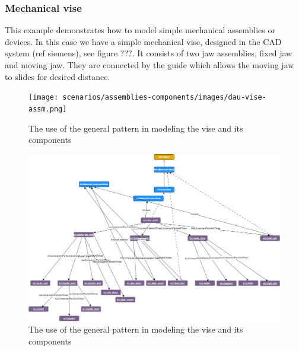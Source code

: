 \subsubsection*{Mechanical vise}
This example demonstrates how to model simple mechanical assemblies or devices. In this case we have a simple mechanical vise, designed in the CAD system (ref siemens), see figure ???. It consists of two jaw assemblies, fixed jaw and moving jaw. They are connected by the guide which allows the moving jaw to slides for desired distance.
\begin{figure}
\texttt{[image: scenarios/assemblies-components/images/dau-vise-assm.png]}
\caption{The use of the general pattern in modeling the vise and its components} 
\label{vise-assmebly-model}
\end{figure}
\begin{figure}
\includegraphics[scale=0.5]{scenarios/assemblies-components/images/vise-asembly-component.png}
\caption{The use of the general pattern in modeling the vise and its components} 
\label{vise-assmebly-components}
\end{figure}





